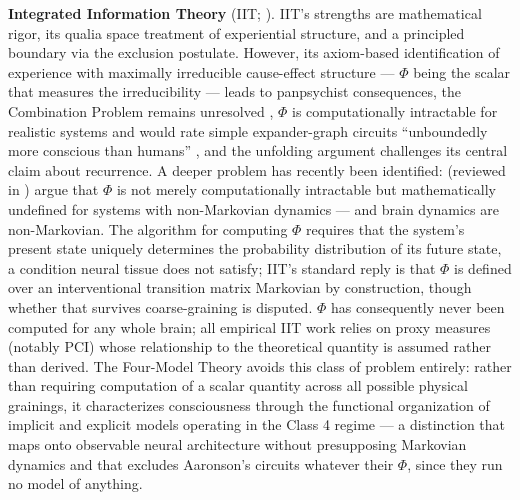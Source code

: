\documentclass[12pt]{article}
\begin{document}
\textbf{Integrated Information Theory} (IIT; \citealp{Tononi2004,Albantakis2023}). IIT's strengths are mathematical rigor, its qualia space treatment of experiential structure, and a principled boundary via the exclusion postulate. However, its axiom-based identification of experience with maximally irreducible cause-effect structure --- $\Phi$ being the scalar that measures the irreducibility --- leads to panpsychist consequences, the Combination Problem remains unresolved \citep{Chalmers2016}, $\Phi$ is computationally intractable for realistic systems \citep{Mayner2018,Tegmark2016} and would rate simple expander-graph circuits ``unboundedly more conscious than humans'' \citep{Aaronson2014,Cerullo2015}, and the unfolding argument \citep{Doerig2019} challenges its central claim about recurrence. A deeper problem has recently been identified: \citet{BarrettMediano2019} (reviewed in \citealp{Barrett2026}) argue that $\Phi$ is not merely computationally intractable but mathematically undefined for systems with non-Markovian dynamics --- and brain dynamics are non-Markovian. The algorithm for computing $\Phi$ requires that the system's present state uniquely determines the probability distribution of its future state, a condition neural tissue does not satisfy; IIT's standard reply is that $\Phi$ is defined over an interventional transition matrix Markovian by construction, though whether that survives coarse-graining is disputed. $\Phi$ has consequently never been computed for any whole brain; all empirical IIT work relies on proxy measures (notably PCI) whose relationship to the theoretical quantity is assumed rather than derived. The Four-Model Theory avoids this class of problem entirely: rather than requiring computation of a scalar quantity across all possible physical grainings, it characterizes consciousness through the functional organization of implicit and explicit models operating in the Class 4 regime --- a distinction that maps onto observable neural architecture without presupposing Markovian dynamics and that excludes Aaronson's circuits whatever their $\Phi$, since they run no model of anything.
\end{document}
